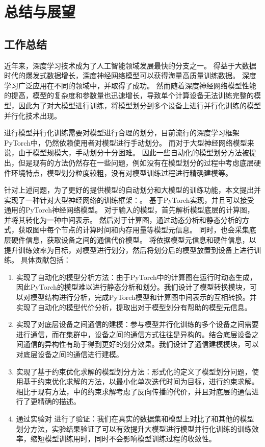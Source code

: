 
\chapter{总结与展望}
\label{sec:summary}

\section{工作总结}
近年来，深度学习技术成为了人工智能领域发展最快的分支之一。
得益于大数据时代的爆发式数据增长，深度神经网络模型可以获得海量高质量训练数据。
深度学习广泛应用在不同的领域中，并取得了成功。
然而随着深度神经网络模型性能的提高，模型的复杂度和参数量也迅速增长，导致单个计算设备无法训练完整的模型，因此为了对大模型进行训练，将模型划分到多个设备上进行并行化训练的模型并行化技术出现。

进行模型并行化训练需要对模型进行合理的划分，目前流行的深度学习框架PyTorch中，仍然依赖使用者对模型进行手动划分。
而对于大型神经网络模型来说，由于模型规模大，手动划分十分困难。
因此一些自动化的模型划分方法被提出，但是现有的方法仍然存在一些问题，例如没有在模型划分的过程中考虑底层硬件环境特点，模型划分粒度较粗，没有对模型训练过程进行精确建模等。

针对上述问题，为了更好的提供模型的自动划分和大模型的训练功能，本文提出并实现了一种针对大型神经网络的训练框架：\sys{}。
\sys{}基于PyTorch实现，并且可以接受通用的PyTorch神经网络模型。
对于输入的模型，\sys{}首先解析模型底层的计算图，并将其转化为一种中间表示。
然后对于计算图，\sys{}通过动态分析和静态分析的方式，获取图中每个节点的计算时间和内存用量等模型元信息。
同时，\sys{}也会采集底层硬件信息，获取设备之间的通信代价模型。
\sys{}将依据模型元信息和硬件信息，以提升训练效率为目标，对模型进行划分，然后将划分后的模型放置到设备上进行训练。
具体贡献包括：
\begin{enumerate}
	\item 实现了自动化的模型分析方法：由于PyTorch中的计算图在运行时动态生成，因此PyTorch的模型难以进行静态分析和划分。我们设计了模型转换模块，可以对模型结构进行分析，完成PyTorch模型和计算图中间表示的互相转换。并实现了自动化的模型代价分析，提取出对于模型划分有帮助的模型元信息。
	\item 实现了对底层设备之间通信的建模：参与模型并行化训练的多个设备之间需要进行通信，而在集群中，设备之间的通信方式往往是异构的。结合底层设备之间通信的异构性有助于得到更好的划分效果。我们设计了通信建模模块，可以对底层设备之间的通信进行建模。
	\item 实现了基于约束优化求解的模型划分方法：\sys{}形式化的定义了模型划分问题，使用基于约束优化求解的方法，以最小化单次迭代时间为目标，进行约束求解。相比于现有方法，\sys{}中的约束求解考虑了反向传播的代价，并且对底层的通信进行了更精确的描述。
	\item 通过实验对\sys{} 进行了验证：我们在真实的数据集和模型上对比了\sys{}和其他的模型划分方法，实验结果验证了\sys{}可以有效提升大模型进行模型并行化训练的训练效率，缩短模型训练用时，同时不会影响模型训练过程的收敛性。
\end{enumerate}


